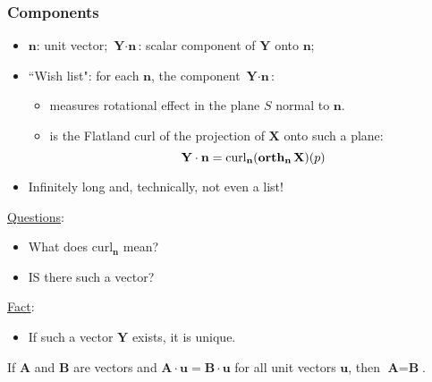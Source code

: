 \begin{frame}
  \frametitle{Components}

  \begin{itemize}
    \item $\textbf{n}$: unit vector; $\textbf{Y} \cdot \textbf{n}$: scalar component of $\textbf{Y}$ onto $\textbf{n}$;
    \item \pause ``Wish list": for each $\textbf{n}$, the component $\textbf{Y} \cdot \textbf{n}$:
    \begin{itemize}
      \item measures rotational effect in the plane $S$ normal to $\textbf{n}$.
      \item is the Flatland curl of the projection of $\textbf{X}$ onto such a plane:
  $$\textbf{Y} \cdot \textbf{n} = \text{curl}_{\textbf{n}} (\operatorname{\textbf{orth}}_{\textbf{n}} \textbf{X})(p)$$
    \end{itemize}
\item \pause Infinitely long and, technically, not even a list!
  \end{itemize}

\pause \underline{Questions}:
\begin{itemize}
  \item \pause What does $\text{curl}_{\textbf{n}}$ mean?
  \item \pause IS there such a vector?
\end{itemize}

\pause \underline{Fact}:
\begin{itemize}
  \item If such a vector $\textbf{Y}$ exists, it is unique.
\end{itemize}

If $\textbf{A}$ and $\textbf{B}$ are vectors and $\textbf{A}\cdot \textbf{u} = \textbf{B}\cdot \textbf{u}$ for all unit vectors $\textbf{u}$, then $\textbf{A}=\textbf{B}$.

\end{frame}


